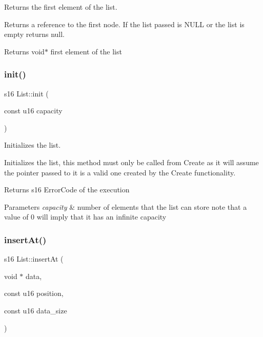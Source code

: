 Returns the first element of the list. 

Returns a reference to the first node. If the list passed is N\+U\+LL or the list is empty returns null.

\begin{DoxyReturn}{Returns}
void$\ast$ first element of the list 
\end{DoxyReturn}
\mbox{\label{class_list_a6c55b7617f9e76681a7f621b7b2fa9c4}} 
\subsubsection{\texorpdfstring{init()}{init()}}
{\footnotesize\ttfamily s16 List\+::init (\begin{DoxyParamCaption}\item[{const u16}]{capacity }\end{DoxyParamCaption})}



Initializes the list. 

Initializes the list, this method must only be called from Create as it will assume the pointer passed to it is a valid one created by the Create functionality.

\begin{DoxyReturn}{Returns}
s16 Error\+Code of the execution 
\end{DoxyReturn}

\begin{DoxyParams}{Parameters}
{\em capacity} & number of elements that the list can store note that a value of 0 will imply that it has an infinite capacity \\
\hline
\end{DoxyParams}
\mbox{\label{class_list_a8db6b9e09b72037ae6705ebdee8a96b0}} 
\subsubsection{\texorpdfstring{insert\+At()}{insertAt()}}
{\footnotesize\ttfamily s16 List\+::insert\+At (\begin{DoxyParamCaption}\item[{void $\ast$}]{data,  }\item[{const u16}]{position,  }\item[{const u16}]{data\+\_\+size }\end{DoxyParamCaption})}



